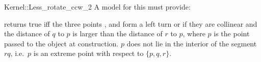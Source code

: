 \begin{ccRefFunctionObjectConcept}{Kernel::Less_rotate_ccw_2}
A model for this must provide:


{returns true iff the three points ,  
and  form a left turn or if they are collinear and
the distance of $q$ to $p$ is
larger than the distance of $r$ to $p$, where $p$ is the point
passed to the object at construction.
\ccPrecond $p$ does not lie in the interior of the segment $rq$,
i.e.~$p$ is an extreme point with respect to $\{p,q,r\}$.}

\end{ccRefFunctionObjectConcept}
